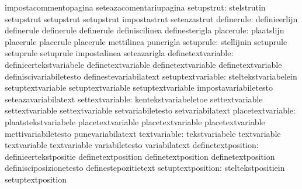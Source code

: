                                   impostacommentopagina            seteazacomentariupagina
                      setupstrut: stelstrutin                      setupstrut
                                  setupstrut                       setupstrut
                                  impostastrut                     seteazastrut
                      definerule: definieerlijn                    definerule
                                  definerule                       definerule
                                  definiscilinea                   definesterigla
                       placerule: plaatslijn                       placerule
                                  placerule                        placerule
                                  mettilinea                       punerigla
                       setuprule: stellijnin                       setuprule
                                  setuprule                        setuprule
                                  impostalinea                     seteazarigla
              definetextvariable: definieertekstvariabele          definetextvariable
                                  definetextvariable               definetextvariable
                                  definiscivariabiletesto          definestevariabilatext
               setuptextvariable: steltekstvariabelein             setuptextvariable
                                  setuptextvariable                setuptextvariable
                                  impostavariabiletesto            seteazavariabilatext
                 settextvariable: kentekstvariabeletoe             settextvariable
                                  settextvariable                  settextvariable
                                  setvariabiletesto                setvariabilatext %
               placetextvariable: plaatstekstvariabele             placetextvariable
                                  placetextvariable                placetextvariable
                                  mettivariabiletesto              punevariabilatext
                    textvariable: tekstvariabele                   textvariable
                                  textvariable                     textvariable
                                  variabiletesto                   variabilatext
              definetextposition: definieertekstpositie            definetextposition
                                  definetextposition               definetextposition
                                  definisciposizionetesto          definestepozitietext
               setuptextposition: steltekstpositiein               setuptextposition
